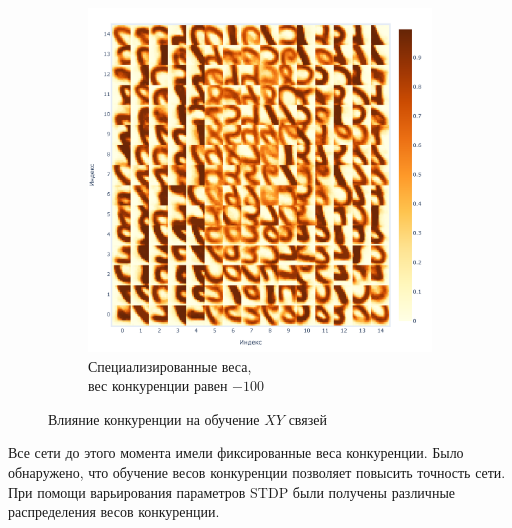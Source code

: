 \documentclass[a4paper]{article}
\begin{document}
\begin{figure}
\begin{subfigure}{0.2\textwidth}
    \includegraphics[width=\textwidth,keepaspectratio=true]{weights_XY_good_ru.pdf}
    \caption{Специализированные веса,\\ вес конкуренции равен $-100$}
\end{subfigure}
\caption{Влияние конкуренции на обучение $XY$ связей}
\end{figure}

Все сети до этого момента имели фиксированные веса конкуренции. Было обнаружено, что обучение весов конкуренции позволяет повысить точность сети. При помощи варьирования параметров STDP были получены различные распределения весов конкуренции.
\end{document}
